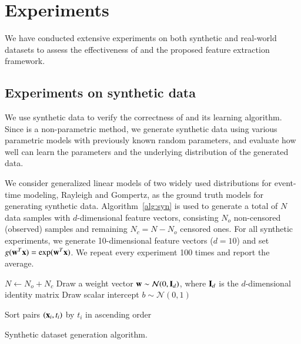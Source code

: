\section{Experiments}\label{sec:results}

We have conducted extensive experiments on both synthetic and real-world datasets to assess the effectiveness of \npglm and the proposed feature extraction framework.

\subsection{Experiments on synthetic data}
We use synthetic data to verify the correctness of \npglm and its learning algorithm. Since \npglm is a non-parametric method, we generate synthetic data using various parametric models with previously known random parameters, and evaluate how well \npglm can learn the parameters and the underlying distribution of the generated data.

We consider generalized linear models of two widely used distributions for event-time modeling, Rayleigh and Gompertz, as the ground truth models for generating synthetic data. Algorithm~\ref{alg:syn} is used to generate a total of $N$ data samples with $d$-dimensional feature vectors, consisting $N_o$ non-censored (observed) samples and remaining $N_c=N-N_o$ censored ones. For all synthetic experiments, we generate 10-dimensional feature vectors ($d=10$) and set $g(\mathbf{w}^T\mathbf{x})=\exp(\mathbf{w}^T\mathbf{x})$. We repeat every experiment 100 times and report the average.

\begin{algorithm}[t]
	\small
	\SetAlgoLined
	$N\leftarrow N_o+N_c$\;
	Draw a weight vector $\mathbf{w}\sim\mathcal{N}(0,\mathbf{I}_d)$, where $\mathbf{I}_d$ is the $d$-dimensional identity matrix\;
	Draw scalar intercept $b\sim\mathcal{N}(0,1)$\;
	
	Sort pairs $(\mathbf{x}_i,t_i)$ by $t_i$ in ascending order\;
	
	\caption{Synthetic dataset generation algorithm.}
	\label{alg:syn}
\end{algorithm}



